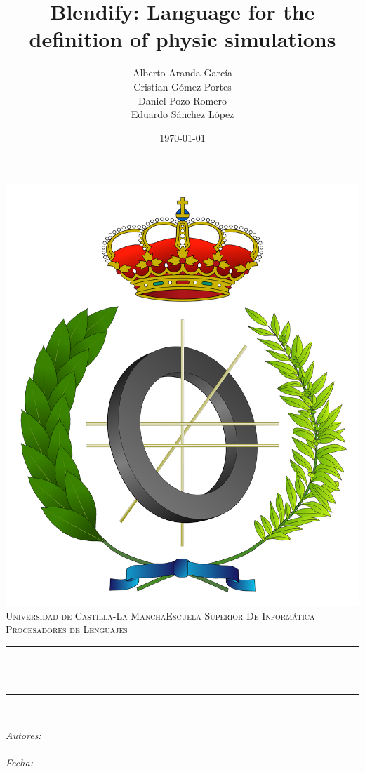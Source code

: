 \documentclass[12pt]{article}
\title{Blendify: Language for the definition of physic simulations}												    %
\author{Alberto Aranda García \\ Cristian Gómez Portes \\ Daniel Pozo Romero \\ Eduardo Sánchez López}				%
\date{\today}																										%
\makeatletter
\let\thetitle\@title
\let\theauthor\@author
\let\thedate\@date
\makeatother
\begin{document}

\begin{titlepage}
	\centering
    \vspace*{0.5 cm}
    \includegraphics[scale = 0.15]{informatica.png}\\[1.0 cm]														%
    \textsc{\LARGE Universidad de Castilla-La Mancha\newline\newline Escuela Superior De Informática}\\[2.0 cm]		%
	\textsc{\Large Procesadores de Lenguajes}\\[0.5 cm]																	%
	\rule{\linewidth}{0.2 mm} \\[0.4 cm]
	{ \huge \bfseries \thetitle}\\
	\rule{\linewidth}{0.2 mm} \\[1.5 cm]
	
	\begin{minipage}{0.4\textwidth}
		\begin{center} \large
			\emph{Autores:}\\
			\theauthor\\
			\vspace*{1 cm}
			\emph{Fecha:}\\
			\thedate\\
			\end{center}
        
	\end{minipage}\\[2 cm]
	
\end{titlepage}
\end{document}

